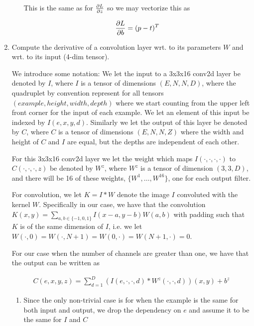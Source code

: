 \documentclass{article}
\begin{document}
\begin{enumerate}[label=(\roman*)]
\begin{enumerate}
    This is the same as for $\pdv{L}{z}$ so we may vectorize this as

    \begin{equation*}
      \pdv{L}{b} = (p - t)^T
    \end{equation*}
    
  \end{enumerate}
  
\item Compute the derivative of a convolution layer wrt. to its parameters $W$ and
  wrt. to its input (4-dim tensor).

  We introduce some notation: We let the input to a 3x3x16 conv2d layer be
  denoted by $I$, where $I$ is a tensor of dimensions $(E, N, N, D)$, where the
  quadruplet by convention represent for all tensors $(example, height, width, depth)$ where
  we start counting from the upper left front corner for the input of each
  example. We let an element of this
  input be indexed by $I(e, x, y, d)$. Similarly we let the output of this layer be
  denoted by $C$, where $C$ is a tensor of dimensions $(E, N, N, Z)$ where the
  width and height of $C$ and $I$ are equal, but the depths are independent of
  each other.

  For this 3x3x16 conv2d layer we let the weight which maps $I(\cdot, \cdot, \cdot,
  \cdot)$ to $C(\cdot, \cdot,
  \cdot, z)$ be denoted by $W^{z}$, where $W^{z}$ is a tensor of dimension $(3,
  3, D)$, and there will be 16 of these weights, $\{W^{1}, \dots, W^{16}\}$, one
  for each output filter.

  For convolution, we let $K = I * W$ denote the image $I$ convoluted with the
  kernel $W$. Specifically in our case, we have that the convolution $K(x, y) =
  \sum_{a, b \in \{-1, 0, 1\}} I(x - a, y - b)W(a, b)$ with padding such that
  $K$ is of the same dimension of $I$, i.e. we let \\$W(\cdot, 0) = W(\cdot, N +
  1) = W(0, \cdot) = W(N + 1, \cdot) = 0$. 

  For our case when the number of channels are greater than one, we have that
  the output can be written as

  \begin{align*}
    C(e, x, y, z) = \sum_{d = 1}^D (I(e, \cdot, \cdot, d) * W^{z}(\cdot, \cdot, d))(x, y) + b^{z}
  \end{align*}

  \begin{enumerate}
  \item Since the only non-trivial case is for when the example is the same for
    both input and output, we drop the dependency on $e$ and assume it to be the
    same for $I$ and $C$


\end{enumerate}
\end{enumerate}
\end{document}
